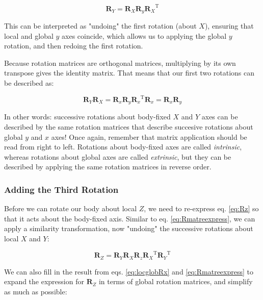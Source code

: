 \documentclass{article}
\begin{document}
\begin{equation}
    \mathbf{R}_Y = \mathbf{R}_X \mathbf{R}_y {\mathbf{R}_X}^\mathrm{T}
    \label{eq:Rmatreexpress}
\end{equation}

This can be interpreted as "undoing" the first rotation (about \(X\)), ensuring that local and global \( y\) axes coincide, which allows us to applying the global \(y\) rotation, and then redoing the first rotation.

Because rotation matrices are orthogonal matrices, multiplying by its own transpose gives the identity matrix. That means that our first two rotations can be described as:

\begin{equation}
    \mathbf{R}_Y \mathbf{R}_X  = \mathbf{R}_x \mathbf{R}_y {\mathbf{R}_x}^\mathrm{T} \mathbf{R}_x = \mathbf{R}_x \mathbf{R}_y
    \label{eq:Rmatcancelout}
\end{equation}

In other words: successive rotations about body-fixed \( X\) and \(Y\) axes can be described by the same rotation matrices that describe succesive rotations about global \(y\) and \(x\) axes! Once again, remember that matrix application should be read from right to left. Rotations about body-fixed axes are called \emph{intrinsic}, whereas rotations about global axes are called \emph{extrinsic}, but they can be described by applying the same rotation matrices in reverse order.

\subsubsection*{Adding the Third Rotation}

Before we can rotate our body about local \(Z\), we need to re-express eq. \ref{eq:Rz} so that it acts about the body-fixed axis. Similar to eq. \ref{eq:Rmatreexpress}, we can apply a similarity transformation, now "undoing" the successive rotations about local \(X\) and \(Y\): 

\begin{equation}
    \mathbf{R}_Z = \mathbf{R}_Y \mathbf{R}_X \mathbf{R}_z {\mathbf{R}_X}^\mathrm{T} {\mathbf{R}_Y}^\mathrm{T}
\end{equation}

We can also fill in the result from eqs. \ref{eq:locglobRx} and \ref{eq:Rmatreexpress} to expand the expression for \( \mathbf{R}_Z \) in terms of global rotation matrices, and simplify as much as possible:
\end{document}
